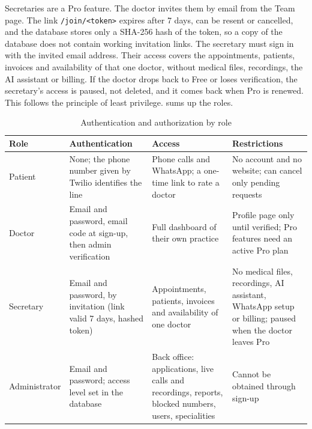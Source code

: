 Secretaries are a Pro feature. The doctor invites them by email from the Team page. The link \texttt{/join/<token>} expires after 7 days, can be resent or cancelled, and the database stores only a SHA-256 hash of the token, so a copy of the database does not contain working invitation links. The secretary must sign in with the invited email address. Their access covers the appointments, patients, invoices and availability of that one doctor, without medical files, recordings, the AI assistant or billing. If the doctor drops back to Free or loses verification, the secretary's access is paused, not deleted, and it comes back when Pro is renewed. This follows the principle of least privilege.  sums up the roles.

\begin{table}[H]
    \centering
    \caption{Authentication and authorization by role}
    \label{tab:auth_matrix}
    \small
    \begin{tabular}{>{\raggedright\arraybackslash}p{\dimexpr 0.1752\dimexpr\textwidth-8\tabcolsep\relax\relax}>{\raggedright\arraybackslash}p{\dimexpr 0.2482\dimexpr\textwidth-8\tabcolsep\relax\relax}>{\raggedright\arraybackslash}p{\dimexpr 0.2847\dimexpr\textwidth-8\tabcolsep\relax\relax}>{\raggedright\arraybackslash}p{\dimexpr 0.2920\dimexpr\textwidth-8\tabcolsep\relax\relax}}
        \toprule
        \textbf{Role} & \textbf{Authentication} & \textbf{Access} & \textbf{Restrictions} \\
        \midrule
        Patient & None; the phone number given by Twilio identifies the line & Phone calls and WhatsApp; a one-time link to rate a doctor & No account and no website; can cancel only pending requests \\
        Doctor & Email and password, email code at sign-up, then admin verification & Full dashboard of their own practice & Profile page only until verified; Pro features need an active Pro plan \\
        Secretary & Email and password, by invitation (link valid 7 days, hashed token) & Appointments, patients, invoices and availability of one doctor & No medical files, recordings, AI assistant, WhatsApp setup or billing; paused when the doctor leaves Pro \\
        Administrator & Email and password; access level set in the database & Back office: applications, live calls and recordings, reports, blocked numbers, users, specialities & Cannot be obtained through sign-up \\
        \bottomrule
    \end{tabular}
\end{table}

